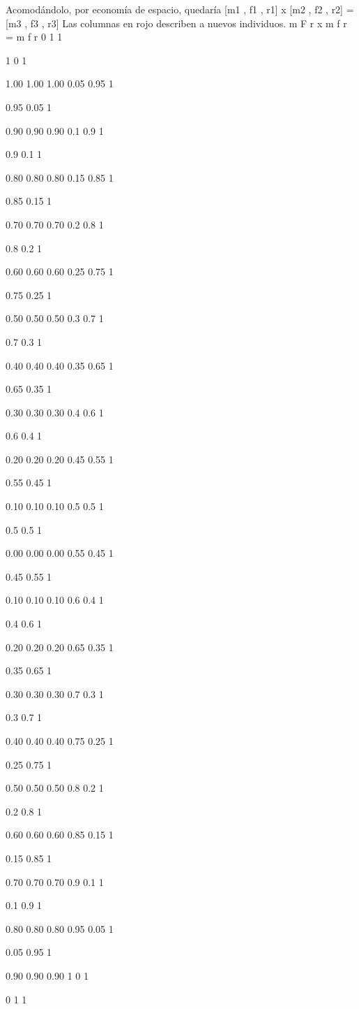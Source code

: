 Acomodándolo, por economía de espacio, quedaría [m1 , f1 , r1] x [m2 , f2 , r2] = [m3 , f3 , r3]
Las columnas en rojo describen a nuevos individuos.
m
F
r
x
m
f
r
=
m
f
r
0
1
1

1
0
1

1.00
1.00
1.00
0.05
0.95
1

0.95
0.05
1

0.90
0.90
0.90
0.1
0.9
1

0.9
0.1
1

0.80
0.80
0.80
0.15
0.85
1

0.85
0.15
1

0.70
0.70
0.70
0.2
0.8
1

0.8
0.2
1

0.60
0.60
0.60
0.25
0.75
1

0.75
0.25
1

0.50
0.50
0.50
0.3
0.7
1

0.7
0.3
1

0.40
0.40
0.40
0.35
0.65
1

0.65
0.35
1

0.30
0.30
0.30
0.4
0.6
1

0.6
0.4
1

0.20
0.20
0.20
0.45
0.55
1

0.55
0.45
1

0.10
0.10
0.10
0.5
0.5
1

0.5
0.5
1

0.00
0.00
0.00
0.55
0.45
1

0.45
0.55
1

0.10
0.10
0.10
0.6
0.4
1

0.4
0.6
1

0.20
0.20
0.20
0.65
0.35
1

0.35
0.65
1

0.30
0.30
0.30
0.7
0.3
1

0.3
0.7
1

0.40
0.40
0.40
0.75
0.25
1

0.25
0.75
1

0.50
0.50
0.50
0.8
0.2
1

0.2
0.8
1

0.60
0.60
0.60
0.85
0.15
1

0.15
0.85
1

0.70
0.70
0.70
0.9
0.1
1

0.1
0.9
1

0.80
0.80
0.80
0.95
0.05
1

0.05
0.95
1

0.90
0.90
0.90
1
0
1

0
1
1


